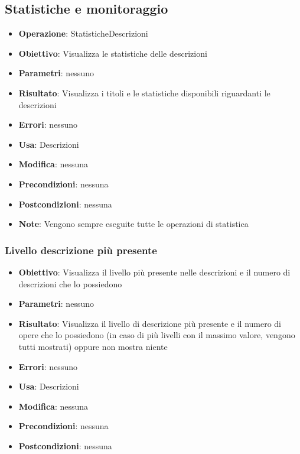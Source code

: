 \subsection{Statistiche e monitoraggio}
\begin{itemize}
	\item \textbf{Operazione}: StatisticheDescrizioni
	\item \textbf{Obiettivo}: Visualizza le statistiche delle descrizioni
	\item \textbf{Parametri}: nessuno
	\item \textbf{Risultato}: Visualizza i titoli e le statistiche disponibili riguardanti le descrizioni
	\item \textbf{Errori}: nessuno
	\item \textbf{Usa}: Descrizioni
	\item \textbf{Modifica}: nessuna
	\item \textbf{Precondizioni}: nessuna
	\item \textbf{Postcondizioni}: nessuna
	\item \textbf{Note}: Vengono sempre eseguite tutte le operazioni di statistica
\end{itemize}

\subsubsection{Livello descrizione più presente}
\begin{itemize}
	\item \textbf{Obiettivo}: Visualizza il livello più presente nelle descrizioni e il numero di descrizioni che lo possiedono
	\item \textbf{Parametri}: nessuno
	\item \textbf{Risultato}: Visualizza il livello di descrizione più presente e il numero di opere che lo possiedono (in caso di più livelli con il massimo valore, vengono tutti mostrati) oppure non mostra niente
	\item \textbf{Errori}: nessuno
	\item \textbf{Usa}: Descrizioni
	\item \textbf{Modifica}: nessuna
	\item \textbf{Precondizioni}: nessuna
	\item \textbf{Postcondizioni}: nessuna
\end{itemize}

